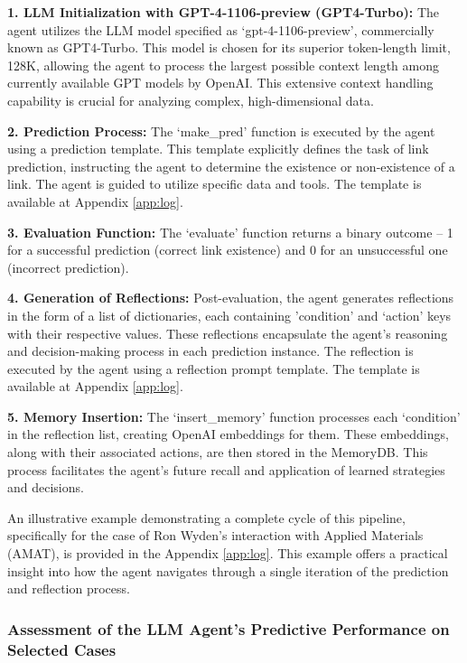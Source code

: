 \documentclass[15pt,letterpaper]{article}
\begin{document}
\textbf{1. LLM Initialization with GPT-4-1106-preview (GPT4-Turbo):} The agent utilizes the LLM model specified as `gpt-4-1106-preview', commercially known as GPT4-Turbo. This model is chosen for its superior token-length limit, 128K, allowing the agent to process the largest possible context length among currently available GPT models by OpenAI. This extensive context handling capability is crucial for analyzing complex, high-dimensional data.

\textbf{2. Prediction Process:} The `make\_pred' function is executed by the agent using a prediction template. This template explicitly defines the task of link prediction, instructing the agent to determine the existence or non-existence of a link. The agent is guided to utilize specific data and tools. The template is available at Appendix \ref{app:log}.

\textbf{3. Evaluation Function:} The `evaluate' function returns a binary outcome – 1 for a successful prediction (correct link existence) and 0 for an unsuccessful one (incorrect prediction).

\textbf{4. Generation of Reflections:} Post-evaluation, the agent generates reflections in the form of a list of dictionaries, each containing 'condition' and `action' keys with their respective values. These reflections encapsulate the agent's reasoning and decision-making process in each prediction instance.
The reflection is executed by the agent using a reflection prompt template. The template is available at Appendix \ref{app:log}.

\textbf{5. Memory Insertion:} The `insert\_memory' function processes each `condition' in the reflection list, creating OpenAI embeddings for them. These embeddings, along with their associated actions, are then stored in the MemoryDB. This process facilitates the agent’s future recall and application of learned strategies and decisions.

An illustrative example demonstrating a complete cycle of this pipeline, specifically for the case of Ron Wyden's interaction with Applied Materials (AMAT), is provided in the Appendix \ref{app:log}. This example offers a practical insight into how the agent navigates through a single iteration of the prediction and reflection process.

\subsubsection{Assessment of the LLM Agent's Predictive Performance on Selected Cases}
\end{document}
